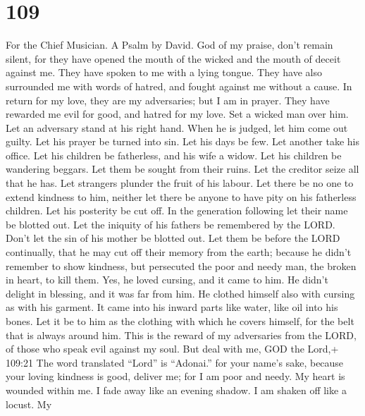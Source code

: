 \hypertarget{section-99}{%
\section{109}\label{section-99}}

For the Chief Musician. A Psalm by David.  God of my praise,
don't remain silent,  for they have opened the mouth of the
wicked and the mouth of deceit against me. They have spoken to me with a
lying tongue.  They have also surrounded me with words of
hatred, and fought against me without a cause.  In return
for my love, they are my adversaries; but I am in prayer. 
They have rewarded me evil for good, and hatred for my love.
 Set a wicked man over him. Let an adversary stand at his
right hand.  When he is judged, let him come out guilty. Let
his prayer be turned into sin.  Let his days be few. Let
another take his office.  Let his children be fatherless,
and his wife a widow.  Let his children be wandering
beggars. Let them be sought from their ruins.  Let the
creditor seize all that he has. Let strangers plunder the fruit of his
labour.  Let there be no one to extend kindness to him,
neither let there be anyone to have pity on his fatherless children.
 Let his posterity be cut off. In the generation following
let their name be blotted out.  Let the iniquity of his
fathers be remembered by the LORD. Don't let the sin of his mother be
blotted out.  Let them be before the LORD continually, that
he may cut off their memory from the earth;  because he
didn't remember to show kindness, but persecuted the poor and needy man,
the broken in heart, to kill them.  Yes, he loved cursing,
and it came to him. He didn't delight in blessing, and it was far from
him.  He clothed himself also with cursing as with his
garment. It came into his inward parts like water, like oil into his
bones.  Let it be to him as the clothing with which he
covers himself, for the belt that is always around him. 
This is the reward of my adversaries from the LORD, of those who speak
evil against my soul.  But deal with me, GOD the Lord,+
109:21 The word translated ``Lord'' is ``Adonai.'' for your name's sake,
because your loving kindness is good, deliver me;  for I am
poor and needy. My heart is wounded within me.  I fade away
like an evening shadow. I am shaken off like a locust.  My
